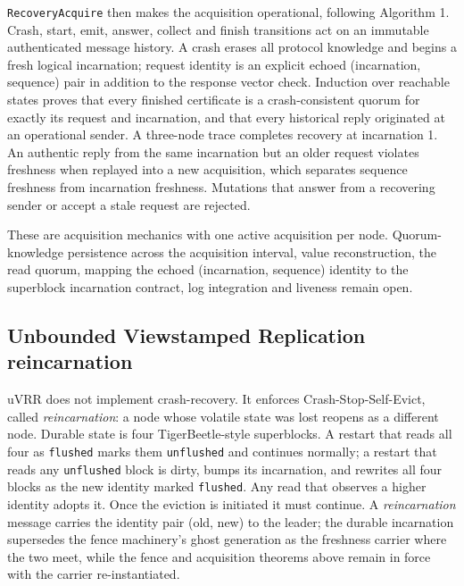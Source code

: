 \documentclass[10pt,journal,letterpaper]{IEEEtran}
\newcommand{\code}[1]{\texttt{\small #1}}
\begin{document}
\texttt{RecoveryAcquire} then makes the acquisition operational, following
Algorithm 1. Crash, start, emit, answer, collect and finish transitions act on
an immutable authenticated message history. A crash erases all protocol
knowledge and begins a fresh logical incarnation; request identity is an
explicit echoed (incarnation, sequence) pair in addition to the response
vector check. Induction over reachable states proves that every finished
certificate is a crash-consistent quorum for exactly its request and
incarnation, and that every historical reply originated at an operational
sender. A three-node trace completes recovery at incarnation 1. An authentic
reply from the same incarnation but an older request violates freshness when
replayed into a new acquisition, which separates sequence freshness from
incarnation freshness. Mutations that answer from a recovering sender or
accept a stale request are rejected.

These are acquisition mechanics with one active acquisition per node.
Quorum-knowledge persistence across the acquisition interval, value
reconstruction, the read quorum, mapping the echoed (incarnation, sequence)
identity to the superblock incarnation contract, log integration and liveness
remain open.

\subsection{Unbounded Viewstamped Replication reincarnation}\label{sec:reincarnation}
uVRR does not implement crash-recovery. It enforces Crash-Stop-Self-Evict, called
\emph{reincarnation}: a node whose volatile state was lost reopens as a different
node. Durable state is four TigerBeetle-style superblocks. A restart that reads all
four as \code{flushed} marks them \code{unflushed} and continues normally; a restart
that reads any \code{unflushed} block is dirty, bumps its incarnation, and rewrites
all four blocks as the new identity marked \code{flushed}. Any read that observes a
higher identity adopts it. Once the eviction is initiated it must continue. A
\emph{reincarnation} message carries the identity pair (old, new) to the leader; the
durable incarnation supersedes the fence machinery's ghost generation as the
freshness carrier where the two meet, while the fence and acquisition theorems above
remain in force with the carrier re-instantiated.
\end{document}

